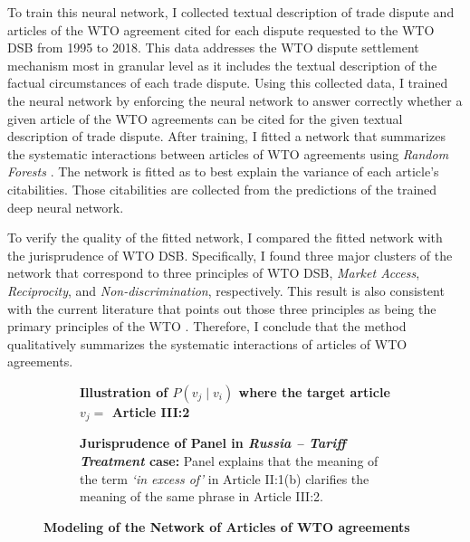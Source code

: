 To train this neural network, I collected textual description of trade dispute and articles of the WTO agreement cited for each dispute requested to the WTO DSB
from 1995 to 2018. This data addresses the WTO dispute settlement mechanism most in granular level as it includes the textual description of the factual circumstances of each trade dispute.
Using this collected data, I trained the neural network by enforcing the neural network to answer correctly
whether a given article of the WTO agreements
can be cited for the given textual description of
trade dispute. After training, I fitted a network that summarizes the systematic interactions between articles of WTO agreements using \textit{Random Forests} \citep{rf, genie3}.
The network is fitted as to best explain the variance of each article's citabilities. Those citabilities are collected from the predictions of the trained deep neural network.

To verify the quality of the fitted network, I compared the fitted network with the jurisprudence of WTO DSB.
Specifically, I found three major clusters of the network that correspond to three principles of WTO DSB, \textit{Market Access}, \textit{Reciprocity}, and \textit{Non-discrimination}, respectively.
This result is also consistent with the current literature that points out those three principles as being the primary principles of the WTO \citep{bagwell}.
Therefore, I conclude that the method qualitatively summarizes the systematic interactions of articles of WTO agreements.


\begin{figure}[t!]
 \captionsetup[subfigure]{justification=centering}
 \begin{subfigure}[b]{1\textwidth}
     \centering{
         
     }
     \caption{\textbf{Illustration of $P(v_j \mid v_i)$ where the target article $v_j=$ Article III:2}}
     \label{subfig:a:art2b}
 \end{subfigure}
 \vfill
 \begin{subfigure}[b]{1\textwidth}
     \centering{
         
     }
     \centering
     \caption{\textbf{Jurisprudence of Panel in \textit{Russia – Tariff Treatment} case:} Panel explains that the meaning of the term \textit{`in excess of'} in Article II:1(b) clarifies the meaning of the same phrase in Article III:2.}
     \label{subfig:a:condprob}
 \end{subfigure}
 \caption{\textbf{Modeling of the Network of Articles of WTO agreements}}
 \label{fig:def-example}
\end{figure}
 
